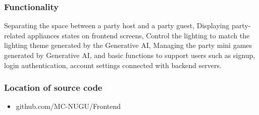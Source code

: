 \documentclass[conference]{IEEEtran}
\begin{document}
        \subsubsection{Functionality}
            Separating the space between a party host and a party guest, Displaying party-related appliances states on frontend screens, Control the lighting to match the lighting theme generated by the Generative AI, Managing the party mini games generated by Generative AI, and basic functions to support users such as signup, login authentication, account settings connected with backend servers.\\
            \vspace{3mm}
        \subsubsection{Location of source code}
            \begin{itemize}
                \item  github.com/MC-NUGU/Frontend
            \end{itemize}
            
\end{document}
